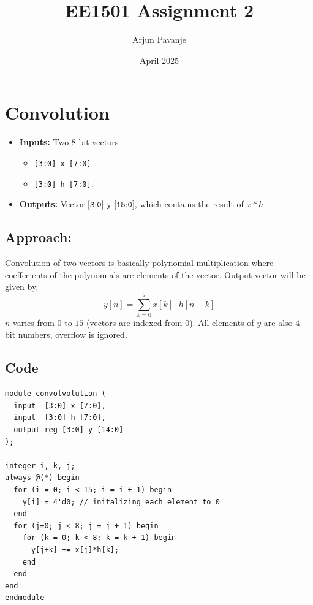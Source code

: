 \documentclass{article}
\title{EE1501 Assignment 2}
\author{Arjun Pavanje}
\date{April 2025}
\begin{document}
\maketitle
\section{Convolution}
\begin{itemize}
    \item \textbf{Inputs:} Two 8-bit vectors 
    \begin{itemize}
        \item \texttt{[3:0] x [7:0]}
        \item \texttt{[3:0] h [7:0]}.
    \end{itemize}
    \item \textbf{Outputs:} Vector $\texttt{[3:0] y [15:0]}$, which contains the result of $x \ast h$
\end{itemize}

\subsection*{Approach:} 
Convolution of two vectors is basically polynomial multiplication where coeffecients of the polynomials are elements of the vector. Output vector will be given by,
\[
y[n] = \sum_{k=0}^{7} x[k] \cdot h[n-k]
\]
$n$ varies from $0$ to $15$ (vectors are indexed from $0$). All elements of $y$ are also $4-$bit numbers, overflow is ignored.
\subsection*{Code}
\begin{lstlisting}[style=style]
module convolvolution (
  input  [3:0] x [7:0],   
  input  [3:0] h [7:0],   
  output reg [3:0] y [14:0]   
);

integer i, k, j;
always @(*) begin
  for (i = 0; i < 15; i = i + 1) begin 
    y[i] = 4'd0; // initalizing each element to 0
  end
  for (j=0; j < 8; j = j + 1) begin
    for (k = 0; k < 8; k = k + 1) begin
      y[j+k] += x[j]*h[k];
    end
  end
end
endmodule
\end{lstlisting}
\end{document}
